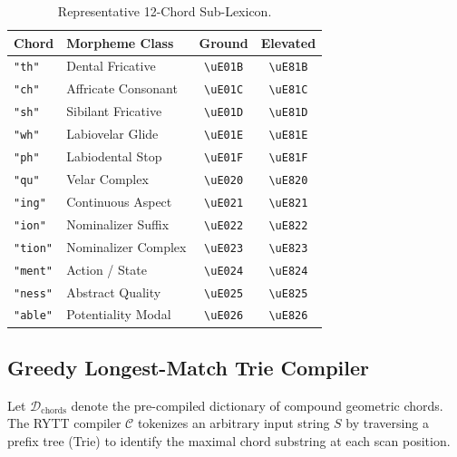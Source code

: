 \documentclass[11pt,oneside,letterpaper]{article}
\theoremstyle{sovereignstyle}
\begin{document}
\begin{table}[htbp]
\centering
\footnotesize
\caption{Representative 12-Chord Sub-Lexicon.}
\label{tab:chord_dict}
\begin{tabularx}{\columnwidth}{lXcc}
\toprule
\textbf{Chord} & \textbf{Morpheme Class} & \textbf{Ground} & \textbf{Elevated} \\
\midrule
\texttt{"th"}   & Dental Fricative     & \texttt{\textbackslash uE01B} & \texttt{\textbackslash uE81B} \\
\texttt{"ch"}   & Affricate Consonant  & \texttt{\textbackslash uE01C} & \texttt{\textbackslash uE81C} \\
\texttt{"sh"}   & Sibilant Fricative   & \texttt{\textbackslash uE01D} & \texttt{\textbackslash uE81D} \\
\texttt{"wh"}   & Labiovelar Glide     & \texttt{\textbackslash uE01E} & \texttt{\textbackslash uE81E} \\
\texttt{"ph"}   & Labiodental Stop     & \texttt{\textbackslash uE01F} & \texttt{\textbackslash uE81F} \\
\texttt{"qu"}   & Velar Complex        & \texttt{\textbackslash uE020} & \texttt{\textbackslash uE820} \\
\texttt{"ing"}  & Continuous Aspect    & \texttt{\textbackslash uE021} & \texttt{\textbackslash uE821} \\
\texttt{"ion"}  & Nominalizer Suffix   & \texttt{\textbackslash uE022} & \texttt{\textbackslash uE822} \\
\texttt{"tion"} & Nominalizer Complex  & \texttt{\textbackslash uE023} & \texttt{\textbackslash uE823} \\
\texttt{"ment"} & Action / State       & \texttt{\textbackslash uE024} & \texttt{\textbackslash uE824} \\
\texttt{"ness"} & Abstract Quality     & \texttt{\textbackslash uE025} & \texttt{\textbackslash uE825} \\
\texttt{"able"} & Potentiality Modal   & \texttt{\textbackslash uE026} & \texttt{\textbackslash uE826} \\
\bottomrule
\end{tabularx}
\end{table}

\subsection{Greedy Longest-Match Trie Compiler}
Let $\mathcal{D}_{\text{chords}}$ denote the pre-compiled dictionary of compound geometric chords. The RYTT compiler $\mathcal{C}$ tokenizes an arbitrary input string $S$ by traversing a prefix tree (Trie) to identify the maximal chord substring at each scan position.
\end{document}
